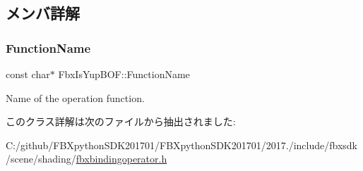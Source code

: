 \subsection{メンバ詳解}
\mbox{\label{class_fbx_is_yup_b_o_f_a0db8ffbc3f9941561f19ad457493f917}} 
\subsubsection{\texorpdfstring{Function\+Name}{FunctionName}}
{\footnotesize\ttfamily const char$\ast$ Fbx\+Is\+Yup\+B\+O\+F\+::\+Function\+Name\hspace{0.3cm}{\ttfamily [static]}}



Name of the operation function. 



このクラス詳解は次のファイルから抽出されました\+:\begin{DoxyCompactItemize}
\item 
C\+:/github/\+F\+B\+Xpython\+S\+D\+K201701/\+F\+B\+Xpython\+S\+D\+K201701/2017./include/fbxsdk/scene/shading/\hyperlink{fbxbindingoperator_8h}{fbxbindingoperator.\+h}\end{DoxyCompactItemize}
